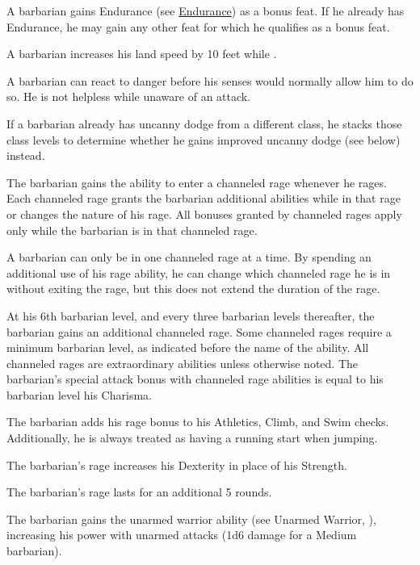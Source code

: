  A barbarian gains Endurance (see \hyperlink{feat:Endurance}{Endurance}) as a bonus feat. If he already has Endurance, he may gain any other feat for which he qualifies as a bonus feat.

 A barbarian increases his land speed by 10 feet while \unencumbered.

 A barbarian can react to danger before his senses would normally allow him to do so. He is not helpless while unaware of an attack.

If a barbarian already has uncanny dodge from a different class, he stacks those class levels to determine whether he gains improved uncanny dodge (see below) instead.

 The barbarian gains the ability to enter a channeled rage whenever he rages. Each channeled rage grants the barbarian additional abilities while in that rage or changes the nature of his rage. All bonuses granted by channeled rages apply only while the barbarian is in that channeled rage.

A barbarian can only be in one channeled rage at a time. By spending an additional use of his rage ability, he can change which channeled rage he is in without exiting the rage, but this does not extend the duration of the rage.

At his 6th barbarian level, and every three barbarian levels thereafter, the barbarian gains an additional channeled rage. Some channeled rages require a minimum barbarian level, as indicated before the name of the ability. All channeled rages are extraordinary abilities unless otherwise noted. The barbarian's special attack bonus with channeled rage abilities is equal to his barbarian level \add his Charisma.

 The barbarian adds his rage bonus to his Athletics, Climb, and Swim checks. Additionally, he is always treated as having a running start when jumping.

 The barbarian's rage increases his Dexterity in place of his Strength.

 The barbarian's rage lasts for an additional 5 rounds.

 The barbarian gains the unarmed warrior ability (see Unarmed Warrior, ), increasing his power with unarmed attacks (1d6 damage for a Medium barbarian).

